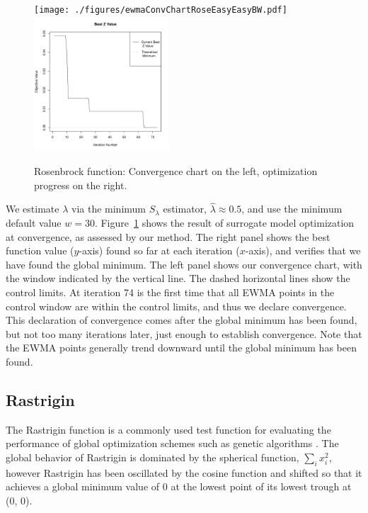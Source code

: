 \documentclass[12pt]{article}
\def \roseLamb {
        0.5     
}
\begin{document}
\begin{figure}[htb]
  \texttt{[image: ./figures/ewmaConvChartRoseEasyEasyBW.pdf]}
  \includegraphics[width=0.45\textwidth]{./figures/bestZRoseEasyEasyEnd.pdf}
  \caption{Rosenbrock function: Convergence chart on the left, optimization progress on the right.}
\label{fig:rosenbrock}
\end{figure}
We estimate $\lambda$ via the minimum $S_\lambda$ estimator, $\hat\lambda\approx\roseLamb$, and use the minimum default value $w=30$.
%
Figure~\ref{fig:rosenbrock} shows the result of surrogate model optimization at convergence, as assessed by our method.  
%
The right panel shows the best function value ($y$-axis) found so far at each iteration ($x$-axis), and verifies that we have found the global minimum. 
%
The left panel shows our convergence chart, with the window indicated by the vertical line.  
%
The dashed horizontal lines show the control limits. 
%
At iteration 74 is the first time that all EWMA points in the control window are within the control limits, and thus we declare convergence.  This declaration of convergence comes after the global minimum has been found, but not too many iterations later, just enough to establish convergence.
%
Note that the EWMA points generally trend downward until the global minimum has been found.  

%
%
\subsection{Rastrigin}
%
%

%
The Rastrigin function is a commonly used test function for evaluating the performance of global optimization schemes such as genetic algorithms \citep{rastCite}.
%
The global behavior of Rastrigin is dominated by the spherical function, $\sum_i x_i^2$, however Rastrigin has been oscillated by the cosine function and shifted so that it achieves a global minimum value of 0 at the lowest point of its lowest trough at (0, 0).
\end{document}
